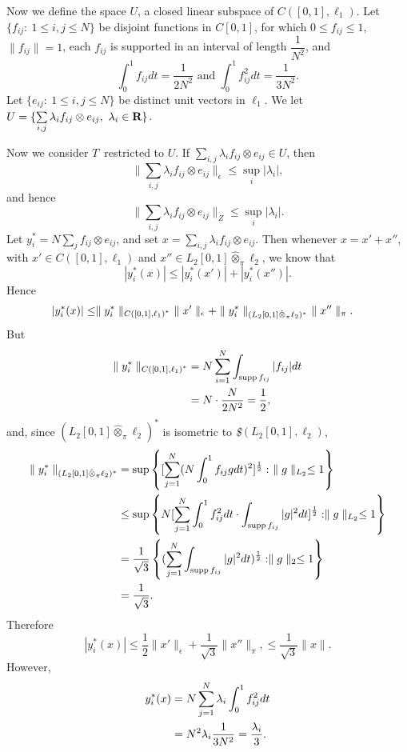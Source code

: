 \medskip

Now we define the space $U$, a
closed linear subspace of $C\left([0,1], \ell_1\right)$. Let 
$\{f_{ij}:\ 1\leq i, j\leq N\}$ be disjoint
functions in $C[0,1]$, for which $0\leq f_{ij} \leq 1$, $ \parallel
f_{ij}\parallel =1$, each $f_{ij}$ is supported in an interval of 
length
$\dfrac 1{N^2}$, and
$$
\int^1_0f_{ij}dt=\dfrac 1{2N^2}\text { and }\int^1_0f_{ij}^2dt=\dfrac
1{3N^2}.
$$
Let $\{e_{ij}:\ 1\leq i, j\leq N\}$ be distinct unit vectors in 
$\ell_1$. We let
$U=\{\sum\limits_{i,j}\lambda_if_{ij}\otimes e_{ij},\ \lambda_i\in 
\hbox{\bf R}\}$.

Now we consider $T$\ restricted to $U$.  If
$\sum\limits_{i,j}\lambda_i f_{ij}\otimes e_{ij}\in U$, then $$
\parallel\sum\limits_{i,j}\lambda_if_{ij}\otimes 
e_{ij}\parallel_\epsilon \leq
\sup\limits_i|\lambda_i|,
$$
and hence
$$\parallel \sum\limits_{i,j}\lambda_if_{ij}\otimes
e_{ij}\parallel_Z\leq \sup\limits_{i}|\lambda_i|.
$$
Let $y^*_i=N\sum\limits_jf_{ij}\otimes e_{ij}$, and set
$x=\sum\limits_{i,j}\lambda_if_{ij}\otimes e_{ij}$.  Then whenever
$x=x'+x''$, with $x'\in C\left([0,1], \ell_1\right)$ and $x''\in
L_2[0,1]\hat \otimes_\pi \ell_2$, we know that
$$
|y^*_i(x)|\leq |y^*_i(x')|+|y^*_i(x'')|.
$$
Hence
$$
\aligned
|y^*_i(x)|&\leq \parallel y^*_i\parallel_{C\left([0,1], 
\ell_1\right)^*}\
\parallel x'\parallel_\epsilon+\parallel y^*_i\parallel_{(L_2[0,1]\hat
\otimes_\pi \ell_2)^*}\
\parallel x''\parallel_\pi.\endaligned
$$
But
$$
\aligned
\parallel y^*_i\parallel_{C\left([0,1],
\ell_1\right)^*}&=N\sum\limits^N_{i=1}\int_{\supp
f_{ij}}|f_{ij}|dt\\
&=N\cdot \dfrac N{2N^2}=\dfrac 12,\endaligned
$$
and, since $\left(L_2[0,1]\hat \otimes_\pi \ell_2\right)^*$
is isometric to {\it \$}$\left(L_2[0,1], \ell_2\right)$,
$$
\aligned
\parallel y^*_i\parallel_{(L_2[0,1]\hat \otimes_\pi \ell_2)^*}
&=\sup\left\{[\sum\limits^N_{j=1}(N\int^1_0f_{ij}gdt)^2]^{\frac 12}:\
\parallel g\parallel_{L_2}\leq 1\right\}\\
&\leq \sup \left\{N[\sum\limits^N_{j=1}\int^1_0f_{ij}^2dt\cdot
\int_{\supp f_{ij}}|g|^2dt]^{\frac 12}:\parallel g\parallel_{L_2}\leq
1\right\}\\
&=\dfrac 1{\sqrt 3}\left\{(\sum\limits^N_{j=1}\int_{\supp
f_{ij}}|g|^2dt)^{\frac 12}:\parallel g\parallel_2\leq 1\right\}\\
&=\dfrac 1{\sqrt 3}.\endaligned
$$
Therefore
$$
|y_i^*(x)| \leq \dfrac 12 \parallel x'\parallel_\epsilon +\dfrac 
1{\sqrt
3}\parallel x''\parallel_\pi,\leq \dfrac 1{\sqrt 3}\parallel 
x\parallel.
$$
However,
$$
\aligned
y^*_i(x)&=N\sum\limits^N_{j=1}\lambda_i\int^1_0f_{ij}^2dt\\
&=N^2\lambda_i\dfrac 1{3N^2}=\dfrac {\lambda_i}3.\endaligned
$$
